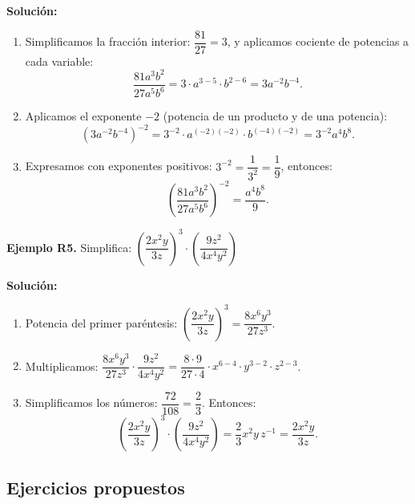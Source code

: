 \documentclass[12pt, letterpaper]{article}
\begin{document}
\begin{cuadrosolucion}
  \textbf{Solución:}
  \begin{enumerate}
    \item Simplificamos la fracción interior: $\dfrac{81}{27} = 3$, y aplicamos cociente de potencias a cada variable:
          $$\frac{81a^3b^2}{27a^5b^6} = 3 \cdot a^{3-5} \cdot b^{2-6} = 3a^{-2}b^{-4}.$$
    \item Aplicamos el exponente $-2$ (potencia de un producto y de una potencia):
          $$\left(3a^{-2}b^{-4}\right)^{-2} = 3^{-2} \cdot a^{(-2)(-2)} \cdot b^{(-4)(-2)} = 3^{-2}a^{4}b^{8}.$$
    \item Expresamos con exponentes positivos: $3^{-2} = \dfrac{1}{3^2} = \dfrac{1}{9}$, entonces:
          $$\left(\frac{81a^3b^2}{27a^5b^6}\right)^{-2} = \frac{a^4b^8}{9}.$$
  \end{enumerate}
\end{cuadrosolucion}

\textbf{Ejemplo R5.} Simplifica: $\left(\dfrac{2x^2y}{3z}\right)^3 \cdot \left(\dfrac{9z^2}{4x^4y^2}\right)$

\begin{cuadrosolucion}
  \textbf{Solución:}
  \begin{enumerate}
    \item Potencia del primer paréntesis: $\left(\dfrac{2x^2y}{3z}\right)^3 = \dfrac{8x^6y^3}{27z^3}$.
    \item Multiplicamos: $\dfrac{8x^6y^3}{27z^3} \cdot \dfrac{9z^2}{4x^4y^2} = \dfrac{8 \cdot 9}{27 \cdot 4} \cdot x^{6-4} \cdot y^{3-2} \cdot z^{2-3}$.
    \item Simplificamos los números: $\dfrac{72}{108} = \dfrac{2}{3}$. Entonces:
          $$\left(\frac{2x^2y}{3z}\right)^3 \cdot \left(\frac{9z^2}{4x^4y^2}\right) = \frac{2}{3}x^2y\, z^{-1} = \frac{2x^2y}{3z}.$$
  \end{enumerate}
\end{cuadrosolucion}

\newpage

\subsection{Ejercicios propuestos}
\end{document}
